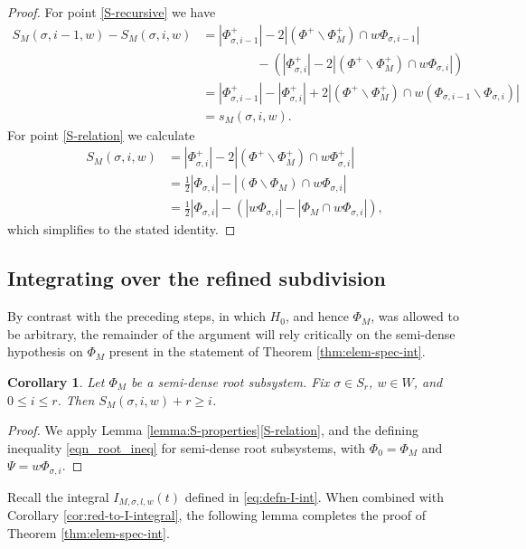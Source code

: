 \documentclass[12pt]{amsart}
\newtheorem{cor}[theorem]{Corollary}
\theoremstyle{remark}
\begin{document}
\begin{proof}
For point \eqref{S-recursive} we have
\begin{align*}
S_M(\sigma,i-1,w)-S_M(\sigma,i,w)&=|\Phi_{\sigma, i-1}^+| - 2|(\Phi^+ \smallsetminus \Phi^+_M) \cap w \Phi_{\sigma, i-1}|\\
&\qquad\qquad\;-(|\Phi_{\sigma, i}^+| - 2|(\Phi^+ \smallsetminus \Phi^+_M) \cap w \Phi_{\sigma, i}|)\\
&=|\Phi_{\sigma, i-1}^+| -|\Phi_{\sigma, i}^+|+ 2|(\Phi^+ \smallsetminus \Phi^+_M) \cap w (\Phi_{\sigma, i-1}\smallsetminus  \Phi_{\sigma, i})|\\
&=s_M(\sigma,i,w).
\end{align*}
For point \eqref{S-relation} we calculate
\begin{align*}
S_M(\sigma, i, w) &= |\Phi_{\sigma, i}^+| - 2|(\Phi^+ \smallsetminus \Phi^+_M) \cap w\Phi_{\sigma, i}^+|\\
&= \frac12 |\Phi_{\sigma, i}| - |(\Phi \smallsetminus \Phi_M) \cap w \Phi_{\sigma, i}|\\
&= \frac12 |\Phi_{\sigma, i}| - (|w\Phi_{\sigma, i}|-  |\Phi_M\cap w\Phi_{\sigma, i} |),
\end{align*}
which simplifies to the stated identity.\end{proof}

\subsection{Integrating over the refined subdivision}

By contrast with the preceding steps, in which $H_0$, and hence $\Phi_M$, was allowed to be arbitrary, the remainder of the argument will rely critically on the semi-dense hypothesis on $\Phi_M$ present in the statement of Theorem \ref{thm:elem-spec-int}.

\begin{cor}\label{cor:S-non-negative}
Let $\Phi_M$ be a semi-dense root subsystem. Fix $\sigma\in S_r$, $w\in W$, and $0\le i\le r$. Then $S_M(\sigma,i,w)+r\ge i$.
\end{cor}

\begin{proof}
We apply Lemma \ref{lemma:S-properties}\eqref{S-relation}, and the defining inequality \eqref{eqn_root_ineq} for semi-dense root subsystems, with $\Phi_0 = \Phi_M$ and $\Psi=w\Phi_{\sigma, i}$.
\end{proof}


Recall the integral $I_{M,\sigma, l,w}(t)$ defined in \eqref{eq:defn-I-int}. When combined with Corollary \ref{cor:red-to-I-integral}, the following lemma completes the proof of Theorem \ref{thm:elem-spec-int}. 
\end{document}

